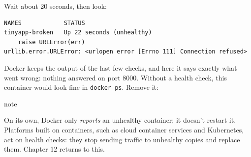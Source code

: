 
Wait about 20 seconds, then look:

\begin{codeblock}

\begin{Shaded}
\begin{Highlighting}[]
 
 \KeywordTok{|} 
\end{Highlighting}
\end{Shaded}

\end{codeblock}

\begin{codeblock}
\begin{Verbatim}[formatcom=\outputstyle]
NAMES            STATUS
tinyapp-broken   Up 22 seconds (unhealthy)
    raise URLError(err)
urllib.error.URLError: <urlopen error [Errno 111] Connection refused>
\end{Verbatim}
\end{codeblock}

Docker keeps the output of the last few checks, and here it says exactly what went wrong: nothing answered on port 8000. Without a health check, this container would look fine in \texttt{docker\ ps}. Remove it:

\begin{codeblock}

\begin{Shaded}
\begin{Highlighting}[]
\end{Highlighting}
\end{Shaded}

\end{codeblock}

\begin{callout}{note}

On its own, Docker only \emph{reports} an unhealthy container; it doesn't restart it. Platforms built on containers, such as cloud container services and Kubernetes, act on health checks: they stop sending traffic to unhealthy copies and replace them. Chapter 12 returns to this.

\end{callout}

